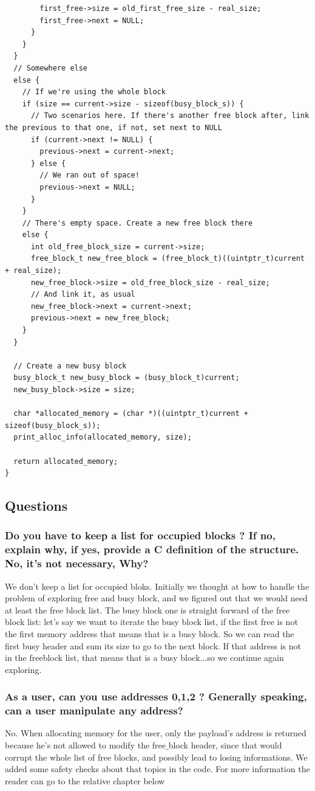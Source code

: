 \documentclass[11pt]{article}
\begin{document}
\begin{lstlisting}
        first_free->size = old_first_free_size - real_size; 
        first_free->next = NULL;
      }
    }
  }
  // Somewhere else
  else {
    // If we're using the whole block
    if (size == current->size - sizeof(busy_block_s)) {
      // Two scenarios here. If there's another free block after, link the previous to that one, if not, set next to NULL
      if (current->next != NULL) {
        previous->next = current->next;
      } else {
        // We ran out of space!
        previous->next = NULL;
      }
    } 
    // There's empty space. Create a new free block there
    else {
      int old_free_block_size = current->size;
      free_block_t new_free_block = (free_block_t)((uintptr_t)current + real_size);
      new_free_block->size = old_free_block_size - real_size;
      // And link it, as usual
      new_free_block->next = current->next;
      previous->next = new_free_block;
    }
  }

  // Create a new busy block
  busy_block_t new_busy_block = (busy_block_t)current;
  new_busy_block->size = size;

  char *allocated_memory = (char *)((uintptr_t)current + sizeof(busy_block_s));
  print_alloc_info(allocated_memory, size);
               
  return allocated_memory;
}
\end{lstlisting}

\subsection{Questions}

\subsubsection*{Do you have to keep a list for occupied blocks ? If no, explain why, if yes, provide a C definition of the structure.
No, it's not necessary, Why?}
We don't keep a list for occupied bloks. Initially we thought at how to handle the problem of exploring free and busy block, and we figured out that we would need at least the free block list. The busy block one is straight forward of the free block list: let's say we want to iterate the busy block list, if the first free is not the first memory address that means that is a busy block. So we can read the first busy header and sum its size to go to the next block. If that address is not in the freeblock list, that means that is a busy block...so we continue again exploring.

\subsubsection*{As a user, can you use addresses 0,1,2 ? Generally speaking, can a user manipulate any address?}
No. When allocating memory for the user, only the payload's address is returned because he's not allowed to modify  the free$\_$block header, since that would corrupt the whole list of free blocks, and possibly lead to losing informations. We added some safety checks about that topics in the code. For more information the reader can go to the relative chapter below
\end{document}

